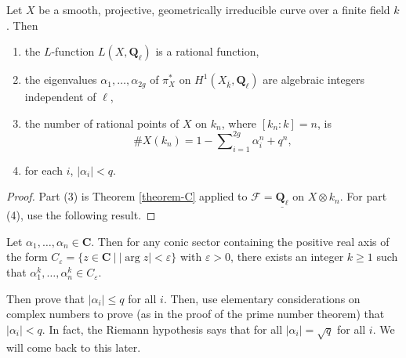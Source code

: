 \begin{lemma}
\label{lemma-count-points-projective}
Let $X$ be a smooth, projective, geometrically irreducible
curve over a finite field $k$. Then
\begin{enumerate}
\item the $L$-function $L(X, \mathbf{Q}_\ell)$ is a rational function,
\item the eigenvalues $\alpha_1, \ldots, \alpha_{2g}$ of $\pi_X^*$ on
$H^1(X_{\bar k}, \mathbf{Q}_\ell)$ are algebraic integers
independent of $\ell$,
\item the number of rational points of $X$ on $k_n$, where $[k_n : k] = n$, is
$$
\# X(k_n) = 1 - \sum\nolimits_{i = 1}^{2g}\alpha_i^n + q^n,
$$
\item for each $i$, $|\alpha_i| < q$.
\end{enumerate}
\end{lemma}

\begin{proof}
Part (3) is Theorem \ref{theorem-C} applied to $\mathcal{F} =
\underline{\mathbf{Q}_\ell}$ on $X \otimes k_n$. For part (4), use the
following result.
\end{proof}

\begin{exercise}
\label{exercise-powers}
Let $\alpha_1, \ldots, \alpha_n \in \mathbf{C}$. Then for any conic sector
containing the positive real axis of the form $C_\varepsilon = \{ z \in
\mathbf{C} \ | \ |\arg z| < \varepsilon \}$ with $\varepsilon >0$, there exists
an integer $k \geq 1$ such that $\alpha_1^k, \ldots, \alpha_n^k \in
C_\varepsilon$.
\end{exercise}

\noindent
Then prove that $|\alpha_i| \leq q$ for all $i$. Then, use elementary
considerations on complex numbers to prove (as in the proof of the prime number
theorem) that $|\alpha_i| < q$. In fact, the Riemann hypothesis says that for
all $|\alpha_i| = \sqrt{q}$ for all $i$. We will come back to this later.

